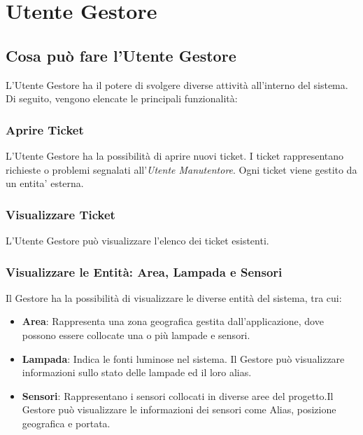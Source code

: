 \chapter{Utente Gestore}

\section{Cosa può fare l'Utente Gestore}
L'Utente Gestore ha il potere di svolgere diverse attività all'interno del sistema. Di seguito, vengono elencate le principali funzionalità:

\subsection{Aprire Ticket}
L'Utente Gestore ha la possibilità di aprire nuovi ticket. 
I ticket rappresentano richieste o problemi segnalati all'\textit{Utente Manutentore}.
Ogni ticket viene gestito da un entita' esterna.

\subsection{Visualizzare Ticket}
L'Utente Gestore può visualizzare l'elenco dei ticket esistenti. 

\subsection{Visualizzare le Entità: Area, Lampada e Sensori}
Il Gestore ha la possibilità di visualizzare le diverse entità del sistema, tra cui:
\begin{itemize}
\item \textbf{Area}: Rappresenta una zona geografica gestita dall'applicazione, dove possono essere collocate una o più lampade e sensori. 
\item \textbf{Lampada}: Indica le fonti luminose nel sistema. Il Gestore può visualizzare informazioni sullo stato delle lampade ed il loro alias.
\item \textbf{Sensori}: Rappresentano i sensori collocati in diverse aree del progetto.Il Gestore può visualizzare le informazioni dei sensori come Alias, posizione geografica e portata.
\end{itemize}

